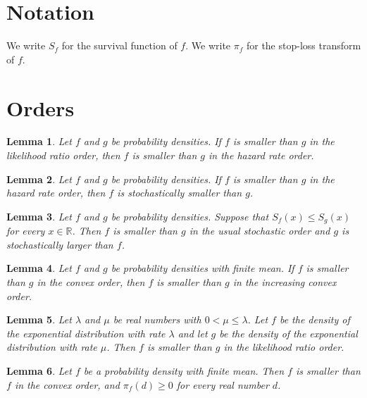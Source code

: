 \documentclass{article}
\newtheorem{lemma}{Lemma}
\begin{document}
\section{Notation}

We write $S_f$ for the survival function of $f$.
We write $\pi_f$ for the stop-loss transform of $f$.

\section{Orders}

\begin{lemma}\label{lr}
Let $f$ and $g$ be probability densities. If $f$ is smaller than $g$ in the likelihood ratio order, then $f$ is smaller than $g$ in the hazard rate order.
\end{lemma}

\begin{lemma}\label{hr}
Let $f$ and $g$ be probability densities. If $f$ is smaller than $g$ in the hazard rate order, then $f$ is stochastically smaller than $g$.
\end{lemma}

\begin{lemma}\label{st}
Let $f$ and $g$ be probability densities. Suppose that $S_f(x)\le S_g(x)$ for every $x\in\mathbb{R}$. Then $f$ is smaller than $g$ in the usual stochastic order and $g$ is stochastically larger than $f$.
\end{lemma}

\begin{lemma}\label{icx}
Let $f$ and $g$ be probability densities with finite mean. If $f$ is smaller than $g$ in the convex order, then $f$ is smaller than $g$ in the increasing convex order.
\end{lemma}

\begin{lemma}\label{exponential}
Let $\lambda$ and $\mu$ be real numbers with $0<\mu\le\lambda$. Let $f$ be the density of the exponential distribution with rate $\lambda$ and let $g$ be the density of the exponential distribution with rate $\mu$. Then $f$ is smaller than $g$ in the likelihood ratio order.
\end{lemma}

\begin{lemma}\label{reflexive}
Let $f$ be a probability density with finite mean. Then $f$ is smaller than $f$ in the convex order, and $\pi_f(d)\ge0$ for every real number $d$.
\end{lemma}
\end{document}
